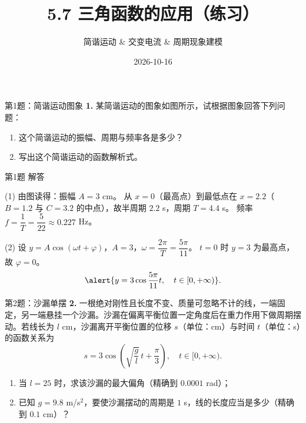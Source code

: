 \documentclass[10pt,aspectratio=169,serif]{beamer}
\title[5.7 三角函数的应用练习]{5.7 三角函数的应用（练习）}
\subtitle{简谐运动 \& 交变电流 \& 周期现象建模}
\author{}
\institute{}
\date{2026-10-16}
\begin{document}
\begin{frame}
  \titlepage
\end{frame}

\begin{frame}[t]{第1题：简谐运动图象}
\textbf{1.} 某简谐运动的图象如图所示，试根据图象回答下列问题：
\begin{enumerate}
  \item 这个简谐运动的振幅、周期与频率各是多少？
  \item 写出这个简谐运动的函数解析式。
\end{enumerate}

\begin{center}
\end{center}
\end{frame}

\begin{frame}[t]{第1题 解答}
\begin{tcolorbox}[colback=orange!10,colframe=orange,title=\textbf{解}]
(1) 由图读得：振幅 $A=3$ cm。
从 $x=0$（最高点）到最低点在 $x=2.2$（$B=1.2$ 与 $C=3.2$ 的中点），故半周期 $2.2$ s，周期 $T=4.4$ s。
频率 $f=\dfrac1T=\dfrac5{22}\approx 0.227$ Hz。

(2) 设 $y=A\cos(\omega t+\varphi)$，$A=3$，$\omega=\dfrac{2\pi}{T}=\dfrac{5\pi}{11}$。
$t=0$ 时 $y=3$ 为最高点，故 $\varphi=0$。
\[
\alert{y=3\cos\frac{5\pi}{11}t,\quad t\in[0,+\infty)}.
\]
\end{tcolorbox}
\end{frame}

\begin{frame}[t]{第2题：沙漏单摆}
\textbf{2.} 一根绝对刚性且长度不变、质量可忽略不计的线，一端固定，另一端悬挂一个沙漏。沙漏在偏离平衡位置一定角度后在重力作用下做周期摆动。若线长为 $l$ cm，沙漏离开平衡位置的位移 $s$（单位：cm）与时间 $t$（单位：s）的函数关系为
\[
s=3\cos\!\left(\sqrt{\frac{g}{l}}\,t+\frac{\pi}{3}\right),\quad t\in[0,+\infty).
\]
\begin{enumerate}
  \item 当 $l=25$ 时，求该沙漏的最大偏角（精确到 $0.0001$ rad）；
  \item 已知 $g=9.8$ m/s$^2$，要使沙漏摆动的周期是 $1$ s，线的长度应当是多少（精确到 $0.1$ cm）？
\end{enumerate}
\end{frame}
\end{document}
